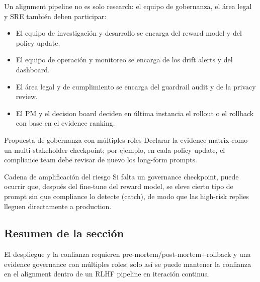 Un alignment pipeline no es solo research: el equipo de gobernanza, el área legal y SRE también deben participar:
\begin{itemize}
    \item El equipo de investigación y desarrollo se encarga del reward model y del policy update.
    \item El equipo de operación y monitoreo se encarga de los drift alerts y del dashboard.
    \item El área legal y de cumplimiento se encarga del guardrail audit y de la privacy review.
    \item El PM y el decision board deciden en última instancia el rollout o el rollback con base en el evidence ranking.
\end{itemize}

\begin{knowledgebox}{Propuesta de gobernanza con múltiples roles}
Declarar la evidence matrix como un multi-stakeholder checkpoint; por ejemplo, en cada policy update, el compliance team debe revisar de nuevo los long-form prompts.
\end{knowledgebox}

\begin{warningbox}{Cadena de amplificación del riesgo}
Si falta un governance checkpoint, puede ocurrir que, después del fine-tune del reward model, se eleve cierto tipo de prompt sin que compliance lo detecte (catch), de modo que las high-risk replies lleguen directamente a production.
\end{warningbox}

\subsection{Resumen de la sección}

El despliegue y la confianza requieren pre-mortem/post-mortem+rollback y una evidence governance con múltiples roles; solo así se puede mantener la confianza en el alignment dentro de un RLHF pipeline en iteración continua.
